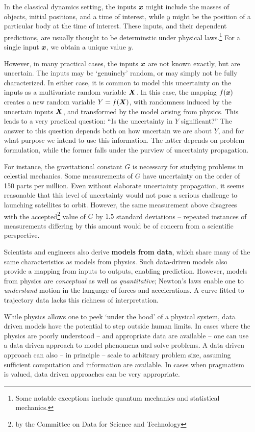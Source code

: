 \documentclass[../primer.tex]{subfiles}
\begin{document}
In the classical dynamics setting, the inputs $\boldsymbol{x}$ might include the masses of
objects, initial positions, and a time of interest, while $y$ might be the
position of a particular body at the time of interest. These inputs, and their
dependent predictions, are usually thought to be determinstic under physical
laws.\footnote{Some notable exceptions include quantum mechanics and statistical
  mechanics.} For a single input $\boldsymbol{x}$, we obtain a unique value $y$.

However, in many practical cases, the inputs $\boldsymbol{x}$ are not known exactly, but
are uncertain. The inputs may be `genuinely' random, or may simply not be fully
characterized. In either case, it is common to model this uncertainty on the
inputs as a multivariate random variable $\boldsymbol{X}$. In this case, the mapping
$f(\boldsymbol{x})$ creates a new random variable $Y = f(\boldsymbol{X})$, with randomness induced by
the uncertain inputs $\boldsymbol{X}$, and transformed by the model arising from physics.
This leads to a very practical question: ``Is the uncertainty in $Y$
significant?'' The answer to this question depends both on how uncertain we are
about $Y$, and for what purpose we intend to use this information. The latter
depends on problem formulation, while the former falls under the purview of
uncertainty propagation.

For instance, the gravitational constant $G$ is necessary for studying problems
in celestial mechanics. Some measurements of $G$ have uncertainty on the order
of 150 parts per million.\cite{rosi2014precision} Even without elaborate
uncertainty propagation, it seems reasonable that this level of uncertainty
would not pose a serious challenge to launching satellites to orbit. However,
the same measurement above disagrees with the accepted\footnote{by the Committee
  on Data for Science and Technology} value of $G$ by $1.5$ standard deviations
-- repeated instances of measurements differing by this amount would be of
concern from a scientific perspective.

Scientists and engineers also derive \textbf{models from data}, which share many
of the same characteristics as models from physics. Such data-driven models also
provide a mapping from inputs to outputs, enabling prediction. However, models
from physics are \emph{conceptual} as well as \emph{quantitative}; Newton's laws
enable one to \emph{understand} motion in the language of forces and
accelerations. A curve fitted to trajectory data lacks this richness of
interpretation.

While physics allows one to peek `under the hood' of a physical system, data
driven models have the potential to step outside human limits. In cases where
the physics are poorly understood -- and appropriate data are available -- one
can use a data driven approach to model phenomena and solve problems. A data
driven approach can also -- in principle -- scale to arbitrary problem size,
assuming sufficient computation and information are available. In cases when
pragmatism is valued, data driven approaches can be very appropriate.
\end{document}
